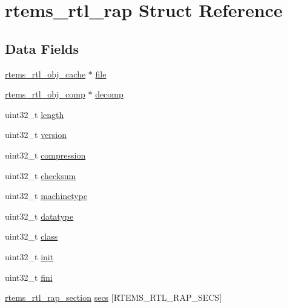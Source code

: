 \hypertarget{structrtems__rtl__rap}{}\section{rtems\+\_\+rtl\+\_\+rap Struct Reference}
\label{structrtems__rtl__rap}
\subsection*{Data Fields}
\begin{DoxyCompactItemize}
\item 
\mbox{\hyperlink{structrtems__rtl__obj__cache}{rtems\+\_\+rtl\+\_\+obj\+\_\+cache}} $\ast$ \mbox{\hyperlink{structrtems__rtl__rap_a43547b4ee32a64a5cce9e147dd14fb2f}{file}}
\item 
\mbox{\hyperlink{rtl-obj-comp_8h_a5ac76d7cdc14a520157bd5c8a322f56c}{rtems\+\_\+rtl\+\_\+obj\+\_\+comp}} $\ast$ \mbox{\hyperlink{structrtems__rtl__rap_ab260e347c29aae508f8c1f2c1ad0f372}{decomp}}
\item 
uint32\+\_\+t \mbox{\hyperlink{structrtems__rtl__rap_a888dfbbdd1bec2216a28654843aa07da}{length}}
\item 
uint32\+\_\+t \mbox{\hyperlink{structrtems__rtl__rap_a8a7e3d7ccf387e9ab8031cf65db4b5a0}{version}}
\item 
uint32\+\_\+t \mbox{\hyperlink{structrtems__rtl__rap_aa4f1c0b92d667a202f120a497a78a7c1}{compression}}
\item 
uint32\+\_\+t \mbox{\hyperlink{structrtems__rtl__rap_a957640d391fe3e812679618e27fa0472}{checksum}}
\item 
uint32\+\_\+t \mbox{\hyperlink{structrtems__rtl__rap_acccdf782b47e69c536661a35a3a58415}{machinetype}}
\item 
uint32\+\_\+t \mbox{\hyperlink{structrtems__rtl__rap_a5acb948026166381bfd8496014f0c2dd}{datatype}}
\item 
uint32\+\_\+t \mbox{\hyperlink{structrtems__rtl__rap_a8e1d7b5713076ab83be83b0566b3a6be}{class}}
\item 
uint32\+\_\+t \mbox{\hyperlink{structrtems__rtl__rap_a7cb289b54b4f1302ad7ee356f8aa894c}{init}}
\item 
uint32\+\_\+t \mbox{\hyperlink{structrtems__rtl__rap_a21a1a8d8bacf77e12964c8627938af9e}{fini}}
\item 
\mbox{\hyperlink{structrtems__rtl__rap__section}{rtems\+\_\+rtl\+\_\+rap\+\_\+section}} \mbox{\hyperlink{structrtems__rtl__rap_a7312f129dd6bc54fde7735a446317488}{secs}} \mbox{[}R\+T\+E\+M\+S\+\_\+\+R\+T\+L\+\_\+\+R\+A\+P\+\_\+\+S\+E\+CS\mbox{]}

\end{DoxyCompactItemize}
